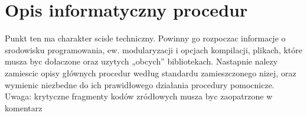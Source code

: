 \chapter{Opis informatyczny procedur}

Punkt ten ma charakter scisle techniczny. Powinny go rozpoczac informacje o srodowisku
programowania, ew. modularyzacji i opcjach kompilacji, plikach, które musza byc dołaczone
oraz uzytych „obcych” bibliotekach. Nastapnie nalezy zamiescic opisy głównych procedur
według standardu zamieszczonego nizej, oraz wymienic niezbedne do ich prawidłowego
działania procedury pomocnicze.
Uwaga: krytyczne fragmenty kodów zródłowych musza byc zaopatrzone w komentarz